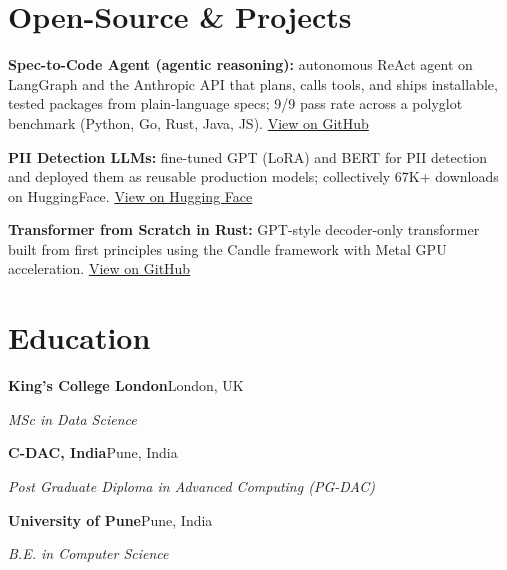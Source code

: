 \documentclass[10pt,a4paper]{article}
\begin{document}
\section{Open-Source \& Projects}
\begin{tight}
  \item \textbf{Spec-to-Code Agent (agentic reasoning):} autonomous ReAct agent on LangGraph and the Anthropic API that plans, calls tools, and ships installable, tested packages from plain-language specs; 9/9 pass rate across a polyglot benchmark (Python, Go, Rust, Java, JS). \href{https://github.com/abhijeetscode/Spec-to-Code-Agent}{View on GitHub}
  \item \textbf{PII Detection LLMs:} fine-tuned GPT (LoRA) and BERT for PII detection and deployed them as reusable production models; collectively 67K+ downloads on HuggingFace. \href{https://huggingface.co/ab-ai/pii_model}{View on Hugging Face}
  \item \textbf{Transformer from Scratch in Rust:} GPT-style decoder-only transformer built from first principles using the Candle framework with Metal GPU acceleration. \href{https://github.com/abhijeetscode/transformer-rust}{View on GitHub}
\end{tight}

\section{Education}
{\color{company}\bfseries King's College London}\hfill {\color{muted}London, UK}\par
{\itshape MSc in Data Science}\par\vspace{2pt}
{\color{company}\bfseries C-DAC, India}\hfill {\color{muted}Pune, India}\par
{\itshape Post Graduate Diploma in Advanced Computing (PG-DAC)}\par\vspace{2pt}
{\color{company}\bfseries University of Pune}\hfill {\color{muted}Pune, India}\par
{\itshape B.E. in Computer Science}\par
\end{document}
